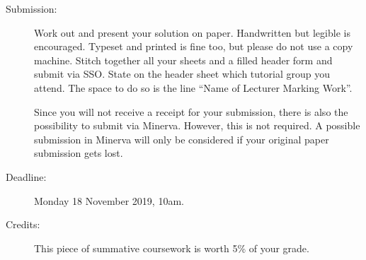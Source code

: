 \documentclass[11pt,a4paper]{article}
\begin{document}
\begin{description}
    
\item[Submission:] Work out and present your solution on paper.
  Handwritten but legible is encouraged. Typeset and printed is fine
  too, but please do not use a copy machine.  Stitch together all your
  sheets and a filled header form and submit via SSO.  State on the
  header sheet which tutorial group you attend. The space to do so is
  the line ``Name of Lecturer Marking Work''.

    Since you will not receive a receipt for your submission, there is also
    the possibility to submit via Minerva. However, this is not required.
    A possible submission in Minerva will only be considered if your original
    paper submission gets lost.


\item[Deadline:] Monday 18 November 2019, 10am.
  
\item[Credits:] This piece of summative coursework is worth 5\% of your grade.

\end{description}
\end{document}
